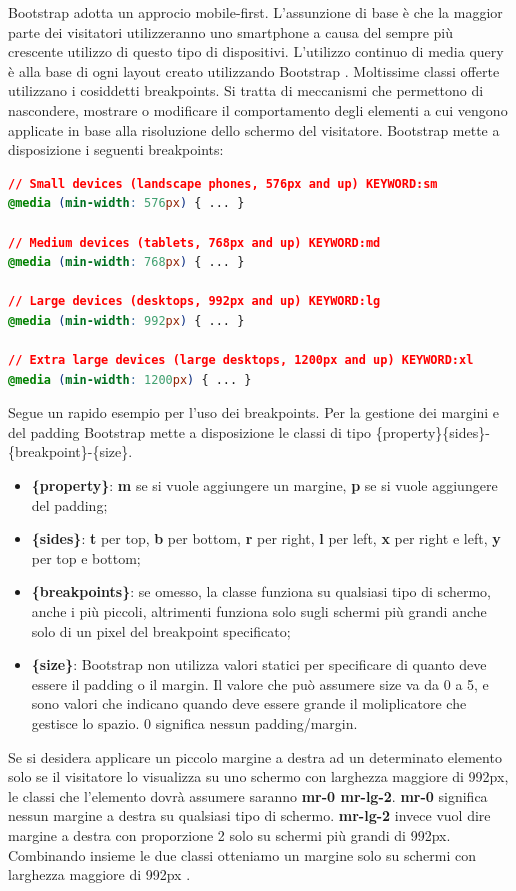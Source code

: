 \noindent Bootstrap adotta un approcio mobile-first.
L'assunzione di base è che la maggior parte dei visitatori utilizzeranno uno smartphone a causa del sempre più crescente utilizzo di questo tipo di dispositivi.\newline
L'utilizzo continuo di media query è alla base di ogni layout creato utilizzando Bootstrap \cite{bootstrap}. \newline Moltissime classi offerte utilizzano i cosiddetti breakpoints. Si tratta di meccanismi che permettono di nascondere, mostrare o modificare il comportamento degli elementi a cui vengono applicate in base alla risoluzione dello schermo del visitatore.
Bootstrap mette a disposizione i seguenti breakpoints:
\begin{lstlisting}[language=CSS]
// Small devices (landscape phones, 576px and up) KEYWORD:sm
@media (min-width: 576px) { ... }

// Medium devices (tablets, 768px and up) KEYWORD:md
@media (min-width: 768px) { ... }

// Large devices (desktops, 992px and up) KEYWORD:lg
@media (min-width: 992px) { ... }

// Extra large devices (large desktops, 1200px and up) KEYWORD:xl
@media (min-width: 1200px) { ... } 
\end{lstlisting}
\noindent Segue un rapido esempio per l'uso dei breakpoints. Per la gestione dei margini e del padding Bootstrap mette a disposizione le classi di tipo \{property\}\{sides\}-\{breakpoint\}-\{size\}.
\begin{itemize}
    \item \textbf{\{property\}}: \textbf{m} se si vuole aggiungere un margine, \textbf{p} se si vuole aggiungere del padding;
    \item \textbf{{\{sides\}}}: \textbf{t} per top, \textbf{b} per bottom, \textbf{r} per right, \textbf{l} per left, \textbf{x} per right e left, \textbf{y} per top e bottom;
    \item \textbf{\{breakpoints\}}: se omesso, la classe funziona su qualsiasi tipo di schermo, anche i più piccoli, altrimenti funziona solo sugli schermi più grandi anche solo di un pixel del breakpoint specificato;
    \item \textbf{\{size\}}: Bootstrap non utilizza valori statici per specificare di quanto deve essere il padding o il margin. Il valore che può assumere size va da 0 a 5, e sono valori che indicano quando deve essere grande il moliplicatore che gestisce lo spazio. 0 significa nessun padding/margin.
    
\end{itemize}
\noindent Se si desidera applicare un piccolo margine a destra ad un determinato elemento solo se il visitatore lo visualizza su uno schermo con larghezza maggiore di 992px, le classi che l'elemento dovrà assumere saranno \textbf{mr-0 mr-lg-2}.\newline
\textbf{mr-0} significa nessun margine a destra su qualsiasi tipo di schermo. \textbf{mr-lg-2} invece vuol dire margine a destra con proporzione 2 solo su schermi più grandi di 992px. Combinando insieme le due classi otteniamo un margine solo su schermi con larghezza maggiore di 992px \cite{bootstrapDoc}.



